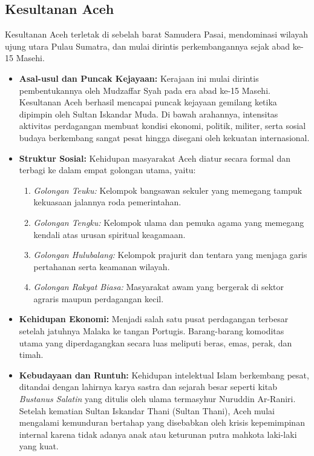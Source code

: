 \documentclass[12pt, a4paper]{article}
\begin{document}
\subsection{Kesultanan Aceh}
Kesultanan Aceh terletak di sebelah barat Samudera Pasai, mendominasi wilayah ujung utara Pulau Sumatra, dan mulai dirintis perkembangannya sejak abad ke-15 Masehi.
\begin{itemize}
	\item \textbf{Asal-usul dan Puncak Kejayaan:} Kerajaan ini mulai dirintis pembentukannya oleh Mudzaffar Syah pada era abad ke-15 Masehi. Kesultanan Aceh berhasil mencapai puncak kejayaan gemilang ketika dipimpin oleh Sultan Iskandar Muda. Di bawah arahannya, intensitas aktivitas perdagangan membuat kondisi ekonomi, politik, militer, serta sosial budaya berkembang sangat pesat hingga disegani oleh kekuatan internasional.
	\item \textbf{Struktur Sosial:} Kehidupan masyarakat Aceh diatur secara formal dan terbagi ke dalam empat golongan utama, yaitu:
		\begin{enumerate}
			\item \textit{Golongan Teuku:} Kelompok bangsawan sekuler yang memegang tampuk kekuasaan jalannya roda pemerintahan.
			\item \textit{Golongan Tengku:} Kelompok ulama dan pemuka agama yang memegang kendali atas urusan spiritual keagamaan.
			\item \textit{Golongan Hulubalang:} Kelompok prajurit dan tentara yang menjaga garis pertahanan serta keamanan wilayah.
			\item \textit{Golongan Rakyat Biasa:} Masyarakat awam yang bergerak di sektor agraris maupun perdagangan kecil.
		\end{enumerate}
	\item \textbf{Kehidupan Ekonomi:} Menjadi salah satu pusat perdagangan terbesar setelah jatuhnya Malaka ke tangan Portugis. Barang-barang komoditas utama yang diperdagangkan secara luas meliputi beras, emas, perak, dan timah.
	\item \textbf{Kebudayaan dan Runtuh:} Kehidupan intelektual Islam berkembang pesat, ditandai dengan lahirnya karya sastra dan sejarah besar seperti kitab \textit{Bustanus Salatin} yang ditulis oleh ulama termasyhur Nuruddin Ar-Raniri. Setelah kematian Sultan Iskandar Thani (Sultan Thani), Aceh mulai mengalami kemunduran bertahap yang disebabkan oleh krisis kepemimpinan internal karena tidak adanya anak atau keturunan putra mahkota laki-laki yang kuat.
\end{itemize}
\end{document}
